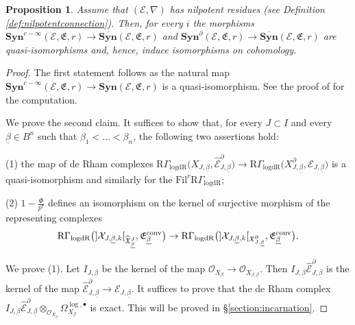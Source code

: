 \documentclass[asterisque,english]{smfart}
\newtheorem{proposition}[theo]{Proposition}
\begin{document}
\begin{proposition}\label{prop:samecohogroups} Assume that $(\mathcal{E},\nabla)$ has nilpotent residues (see Definition \ref{def:nilpotentconnection}). Then, for every $i$ the morphisms  $\mathbf{Syn}^{c-\infty}(\mathcal{E},\mathfrak{E},r)
\to\overline{\mathbf{Syn}}(\mathcal{E},\mathfrak{E},r)$ and $\mathbf{Syn}^\partial(\mathcal{E},\mathfrak{E},r)\to\overline{\mathbf{Syn}}(\mathcal{E},\mathfrak{E},r)$ are quasi-isomorphisms and, hence, induce isomorphisms on cohomology.

\end{proposition}
\begin{proof} The first statement follows as the natural map $\mathbf{Syn}^{c-\infty}(\mathcal{E},\mathfrak{E},r)\to  \overline{\mathbf{Syn}}(\mathcal{E},\mathfrak{E},r)$ is a quasi-isomorphism.  See the proof of \cite[Lemma 3.6]{EY} for the computation.

We prove the second claim. It suffices to show that, for every $J\subset I$ and every $\underline{\beta}\in B^n$ such that $\beta_1<\ldots < \beta_n$, the following two assertions hold: 

(1) the map of de Rham complexes  $\mathrm{R}\Gamma_{\mathrm{logdR}}\bigl(X_{J,\underline{\beta}}, \widehat{\mathcal{E}}^\partial_{J,\underline{\beta}}\bigr) \longrightarrow \mathrm{R}\Gamma_{\mathrm{logdR}}\bigl(X_{J,\underline{\beta}}^\partial, \mathcal{E}_{J,\underline{\beta}}\bigr) $ is a quasi-isomorphism and similarly for the $ \mathrm{Fil}^r \mathrm{R}\Gamma_{\mathrm{logdR}}$;

(2) $1-\frac{\Phi}{p^r}$ defines an isomorphism on the kernel of surjective morphism of the representing complexes $$\mathrm{R}\Gamma_{\mathrm{logdR}}\bigl(]\mathcal{X}_{J,\underline{\beta},k}[_{\widehat{\mathfrak{X}}^J_{\underline{\beta}}},\mathfrak{E}_{\underline{\beta}}^{\rm conv}\bigr) \to  \mathrm{R}\Gamma_{\mathrm{logdR}}\bigl(]\mathcal{X}_{J,\underline{\beta}, k}[_{\mathfrak{X}_{J,\underline{\beta}}^\partial},\mathfrak{E}_{\underline{\beta}}^{\rm conv}\bigr).$$

We prove (1). Let $I_{J,\underline{\beta}}$  be the kernel of the map $\mathcal{O}_{X_{\underline{\beta}}} \to \mathcal{O}_{X_{{J,\underline{\beta}}}}$. Then $I_{J,\underline{\beta}} \widehat{\mathcal{E}}^\partial_{J,\underline{\beta}}$ is the kernel of the map $\widehat{\mathcal{E}}^\partial_{J,\underline{\beta}}\to \mathcal{E}_{J,\underline{\beta}}$. It suffices to prove that  the de Rham complex $I_{J,\underline{\beta}} \widehat{\mathcal{E}}^\partial_{J,\underline{\beta}}\otimes_{\mathcal{O}_{X_{\underline{\beta}}}} \Omega_{X_{\underline{\beta}}}^{\log,\bullet}$ is exact. This will be proved in \S\ref{section:incarnation}.


\end{proof}
\end{document}
